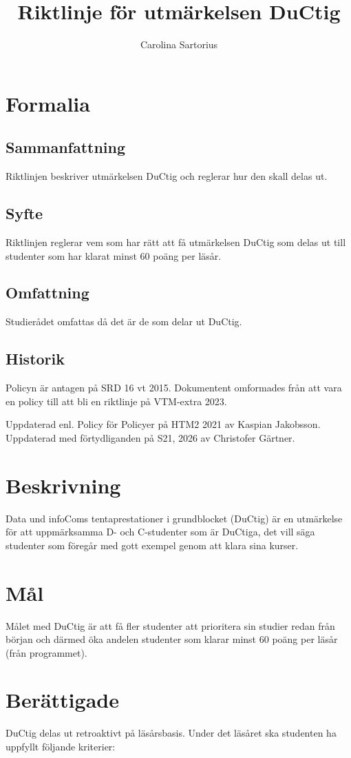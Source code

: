 \documentclass{dsekprotokoll}
\title{Riktlinje för utmärkelsen DuCtig}
\author{Carolina Sartorius}
\begin{document}
\maketitle

\section{Formalia}
\subsection{Sammanfattning}
Riktlinjen beskriver utmärkelsen DuCtig och reglerar hur den skall delas ut.
\subsection{Syfte}
Riktlinjen reglerar vem som har rätt att få utmärkelsen DuCtig som delas ut till studenter som har klarat minst 60 poäng per läsår.
\subsection{Omfattning}
Studierådet omfattas då det är de som delar ut DuCtig.
\subsection{Historik}
Policyn är antagen på SRD 16 vt 2015. Dokumentent omformades från att vara en policy till att bli en riktlinje på VTM-extra 2023.

Uppdaterad enl. Policy för Policyer på HTM2 2021 av Kaspian Jakobsson.
Uppdaterad med förtydliganden på S21, 2026 av Christofer Gärtner.

\section{Beskrivning}
Data und infoComs tentaprestationer i grundblocket (DuCtig) är en utmärkelse för att uppmärksamma D- och C-studenter som är DuCtiga, det vill
säga studenter som föregår med gott exempel genom att klara sina kurser.

\section{Mål}
Målet med DuCtig är att få fler studenter att prioritera sin studier redan från början och därmed
öka andelen studenter som klarar minst 60 poäng per läsår (från programmet).

\section{Berättigade}
DuCtig delas ut retroaktivt på läsårsbasis. Under det läsåret ska studenten ha uppfyllt följande
kriterier:
\end{document}
